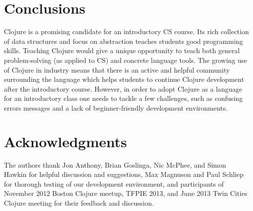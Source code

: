 \documentclass[submission,copyright,creativecommons]{eptcs}
\newcommand{\allcomments}[1]{{#1}}
\newcommand{\elenacomment}[1]{{\bf \textcolor{ForestGreen}{\allcomments{{#1}}}}}
\newcommand{\joecomment}[1]{{\bf \color{JoesGold}{\allcomments{{#1}}}}}
\newcommand{\todo}[1]{{\bf \color{magenta}{\allcomments{ To-do: {#1}}}}}
\begin{document}


\section{Conclusions}
Clojure is a promising candidate for an introductory CS course. Its rich collection of data structures and focus on abstraction teaches students good programming skills. Teaching Clojure would give a unique opportunity to teach both general problem-solving (as applied to CS) and concrete language tools. The growing use of Clojure in industry means that there is an active and helpful community surrounding the language which helps students to continue Clojure development after the introductory course. However, in order to adopt Clojure as a language for an introductory class one needs to tackle a few challenges, such as confusing errors messages and  a lack of beginner-friendly development environments.

\section{Acknowledgments}
The authors thank Jon Anthony, Brian Goslinga, Nic McPhee, and Simon Hawkin for helpful discussion and suggestions, %
Max Magnuson and Paul Schliep for thorough testing of our development environment, and participants of November 2012 Boston Clojure meetup, TFPIE 2013, and June 2013 Twin Cities Clojure meeting for their feedback and discussion. 




\end{document}
